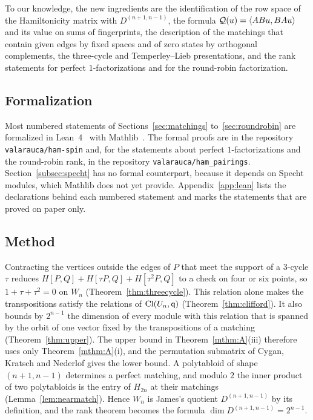 To our knowledge, the new ingredients are the identification of the row space of the Hamiltonicity matrix with $D^{(n+1,n-1)}$, the formula $\mathcal{Q}(u)=\langle ABu,BAu\rangle$ and its value on sums of fingerprints, the description of the matchings that contain given edges by fixed spaces and of zero states by orthogonal complements, the three-cycle and Temperley--Lieb presentations, and the rank statements for perfect $1$-factorizations and for the round-robin factorization. %

\subsection{Formalization}\label{subsec:formal}

Most numbered statements of Sections~\ref{sec:matchings} to~\ref{sec:roundrobin} are formalized in Lean~4~\cite{MU21} with Mathlib~\cite{mathlib20}. The formal proofs are in the repository \texttt{valarauca/ham-spin} and, for the statements about perfect $1$-factorizations and the round-robin rank, in the repository \texttt{valarauca/ham\_pairings}. Section~\ref{subsec:specht} has no formal counterpart, because it depends on Specht modules, which Mathlib does not yet provide. Appendix~\ref{app:lean} lists the declarations behind each numbered statement and marks the statements that are proved on paper only.

\subsection{Method}

Contracting the vertices outside the edges of $P$ that meet the support of a $3$-cycle $\tau$ reduces $H[P,Q]+H[\tau P,Q]+H[\tau^{2}P,Q]$ to a check on four or six points, so $1+\tau+\tau^2=0$ on $W_n$ (Theorem~\ref{thm:threecycle}). This relation alone makes the transpositions satisfy the relations of $\operatorname{Cl}(U_n,\mathsf{q})$ (Theorem~\ref{thm:clifford}). It also bounds by $2^{n-1}$ the dimension of every module with this relation that is spanned by the orbit of one vector fixed by the transpositions of a matching (Theorem~\ref{thm:upper}). The upper bound in Theorem~\ref{mthm:A}(iii) therefore uses only Theorem~\ref{mthm:A}(i), and the permutation submatrix of Cygan, Kratsch and Nederlof gives the lower bound. A polytabloid of shape $(n+1,n-1)$ determines a perfect matching, and modulo $2$ the inner product of two polytabloids is the entry of $H_{2n}$ at their matchings (Lemma~\ref{lem:nearmatch}). Hence $W_n$ is James's quotient $D^{(n+1,n-1)}$ by its definition, and the rank theorem becomes the formula $\dim D^{(n+1,n-1)}=2^{n-1}$.


